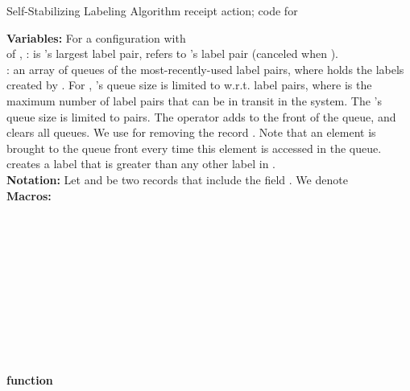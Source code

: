 \documentclass[11pt]{article}
\begin{document}
\begin{algorithm*}[t!]
\caption{{Self-Stabilizing Labeling Algorithm receipt action; code for }}
\label{alg:receiveLabels}


\begin{small}

{\bf Variables:} For a configuration  with \\
 of , :  is 's largest label pair,  refers to 's label pair (canceled when ).\\

: an array of queues of the most-recently-used label pairs, where  holds the labels created by . For , 's queue size is limited to  w.r.t. label pairs, where  is the maximum number of label pairs that can be in transit in the system. The 's queue size is limited to  pairs. The operator  adds  to the front of the queue, and  clears all  queues. We use  for removing the record . Note that an element is brought to the queue front every time this element is accessed in the queue.\\
 creates a label that is greater than any other label in .\\










{\bf Notation:} Let  and  be two records that include the field . We denote        \\

{\bf Macros:}\\
    ~~~\\
  {\Return{}}\\
~~~\\ \label{ln:double}
~~~\\ \label{ln:staleInfo}
~~~\\
    ~~~\\
      ~~~\\
~~\\
~\label{ln:legitLabels}~\\
      ~\label{ln:useOwnLabelDef}


{\bf function} 
\Begin{
  \; \label{ln:exposeStore}
\lIf{  }{} \label{ln:lastSentCancel}

    \lIf{}{} \label{LBLln:clean}

     \lForEach{}{} \label{ln:add}

        \lForEach{}{} \label{ln:cancelLabels}

        \lForEach{}{} \label{ln:receivedCanceled}

        \lForEach{}{} \label{ln:remove}

        \lForEach{}{} \label{ln:cancelMax}

    \lIf{}{} \label{ln:adopt}

    \lElse{}  \label{ln:useOwnLabel} 


}

\end{small}

\end{algorithm*}
\end{document}
